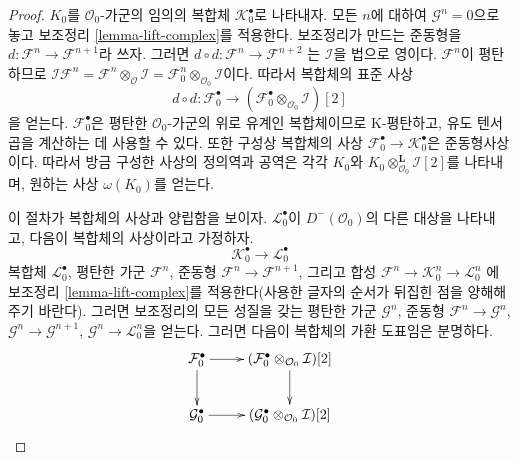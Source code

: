 \begin{proof}
$K_0$를 $\mathcal{O}_0$-가군의 임의의 복합체
$\mathcal{K}_0^\bullet$로 나타내자. 모든 $n$에 대하여
$\mathcal{G}^n = 0$으로 놓고 보조정리 \ref{lemma-lift-complex}를
적용한다. 보조정리가 만드는 준동형을
$d : \mathcal{F}^n \to \mathcal{F}^{n + 1}$라 쓰자. 그러면
$d \circ d : \mathcal{F}^n \to \mathcal{F}^{n + 2}$
는 $\mathcal{I}$을 법으로 영이다. $\mathcal{F}^n$이 평탄하므로
$\mathcal{I}\mathcal{F}^n =
\mathcal{F}^n \otimes_{\mathcal{O}} \mathcal{I} =
\mathcal{F}^n_0 \otimes_{\mathcal{O}_0} \mathcal{I}$이다. 따라서
복합체의 표준 사상
$$
d \circ d : \mathcal{F}_0^\bullet
\longrightarrow
(\mathcal{F}_0^\bullet \otimes_{\mathcal{O}_0} \mathcal{I})[2]
$$
을 얻는다. $\mathcal{F}_0^\bullet$은 평탄한 $\mathcal{O}_0$-가군의
위로 유계인 복합체이므로 K-평탄하고, 유도 텐서곱을 계산하는 데 사용할
수 있다. 또한 구성상 복합체의 사상
$\mathcal{F}_0^\bullet \to \mathcal{K}_0^\bullet$은 준동형사상이다.
따라서 방금 구성한 사상의 정의역과 공역은 각각 $K_0$와
$K_0 \otimes_{\mathcal{O}_0}^\mathbf{L} \mathcal{I}[2]$를 나타내며,
원하는 사상 $\omega(K_0)$를 얻는다.

\medskip\noindent
이 절차가 복합체의 사상과 양립함을 보이자.
$\mathcal{L}_0^\bullet$이 $D^-(\mathcal{O}_0)$의 다른 대상을 나타내고,
다음이 복합체의 사상이라고 가정하자.
$$
\mathcal{K}_0^\bullet \longrightarrow \mathcal{L}_0^\bullet
$$
복합체 $\mathcal{L}_0^\bullet$, 평탄한 가군 $\mathcal{F}^n$, 준동형
$\mathcal{F}^n \to \mathcal{F}^{n + 1}$, 그리고 합성
$\mathcal{F}^n \to \mathcal{K}_0^n \to \mathcal{L}_0^n$
에 보조정리 \ref{lemma-lift-complex}를 적용한다(사용한 글자의 순서가
뒤집힌 점을 양해해 주기 바란다). 그러면 보조정리의 모든 성질을 갖는
평탄한 가군 $\mathcal{G}^n$, 준동형
$\mathcal{F}^n \to \mathcal{G}^n$,
$\mathcal{G}^n \to \mathcal{G}^{n + 1}$,
$\mathcal{G}^n \to \mathcal{L}_0^n$을 얻는다. 그러면 다음이 복합체의
가환 도표임은 분명하다.
$$
\xymatrix{
\mathcal{F}_0^\bullet \ar[d] \ar[r] &
(\mathcal{F}_0^\bullet \otimes_{\mathcal{O}_0} \mathcal{I})[2] \ar[d] \\
\mathcal{G}_0^\bullet \ar[r] &
(\mathcal{G}_0^\bullet \otimes_{\mathcal{O}_0} \mathcal{I})[2]
}
$$


\end{proof}
